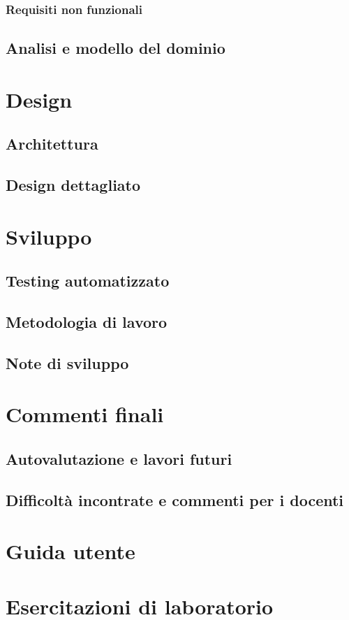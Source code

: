 \documentclass[a4paper]{report}
\begin{document}
	\subsection{Requisiti non funzionali}
	\section{Analisi e modello del dominio}
	\chapter{Design}
	\section{Architettura}
	\section{Design dettagliato}
	\chapter{Sviluppo}
	\section{Testing automatizzato}
	\section{Metodologia di lavoro}
	\section{Note di sviluppo}
	\chapter{Commenti finali}
	\section{Autovalutazione e lavori futuri}
	\section{Difficoltà incontrate e commenti per i docenti}
	\appendix
	\chapter{Guida utente}
	\chapter{Esercitazioni di laboratorio}
	\printbibliography[heading=bibintoc]
\end{document}
